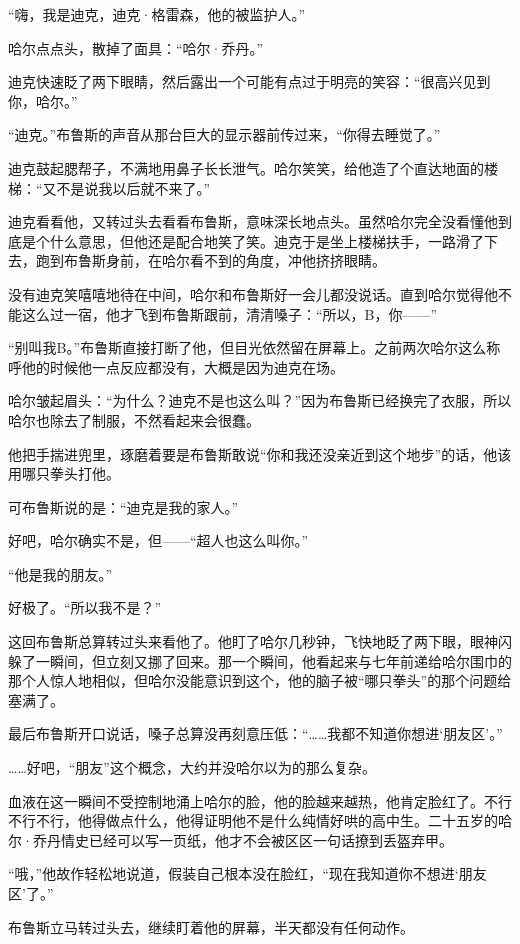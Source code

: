 \documentclass[../main]{subfiles}
\begin{document}
“嗨，我是迪克，迪克·格雷森，他的被监护人。”

哈尔点点头，散掉了面具：“哈尔·乔丹。”

迪克快速眨了两下眼睛，然后露出一个可能有点过于明亮的笑容：“很高兴见到你，哈尔。”

“迪克。”布鲁斯的声音从那台巨大的显示器前传过来，“你得去睡觉了。”

迪克鼓起腮帮子，不满地用鼻子长长泄气。哈尔笑笑，给他造了个直达地面的楼梯：“又不是说我以后就不来了。”

迪克看看他，又转过头去看看布鲁斯，意味深长地点头。虽然哈尔完全没看懂他到底是个什么意思，但他还是配合地笑了笑。迪克于是坐上楼梯扶手，一路滑了下去，跑到布鲁斯身前，在哈尔看不到的角度，冲他挤挤眼睛。

没有迪克笑嘻嘻地待在中间，哈尔和布鲁斯好一会儿都没说话。直到哈尔觉得他不能这么过一宿，他才飞到布鲁斯跟前，清清嗓子：“所以，B，你——”

“别叫我B。”布鲁斯直接打断了他，但目光依然留在屏幕上。之前两次哈尔这么称呼他的时候他一点反应都没有，大概是因为迪克在场。

哈尔皱起眉头：“为什么？迪克不是也这么叫？”因为布鲁斯已经换完了衣服，所以哈尔也除去了制服，不然看起来会很蠢。

他把手揣进兜里，琢磨着要是布鲁斯敢说“你和我还没亲近到这个地步”的话，他该用哪只拳头打他。

可布鲁斯说的是：“迪克是我的家人。”

好吧，哈尔确实不是，但——“超人也这么叫你。”

“他是我的朋友。”

好极了。“所以我不是？”

这回布鲁斯总算转过头来看他了。他盯了哈尔几秒钟，飞快地眨了两下眼，眼神闪躲了一瞬间，但立刻又挪了回来。那一个瞬间，他看起来与七年前递给哈尔围巾的那个人惊人地相似，但哈尔没能意识到这个，他的脑子被“哪只拳头”的那个问题给塞满了。

最后布鲁斯开口说话，嗓子总算没再刻意压低：“……我都不知道你想进`朋友区'。”

……好吧，“朋友”这个概念，大约并没哈尔以为的那么复杂。

血液在这一瞬间不受控制地涌上哈尔的脸，他的脸越来越热，他肯定脸红了。不行不行不行，他得做点什么，他得证明他不是什么纯情好哄的高中生。二十五岁的哈尔·乔丹情史已经可以写一页纸，他才不会被区区一句话撩到丢盔弃甲。

“哦，”他故作轻松地说道，假装自己根本没在脸红，“现在我知道你不想进`朋友区'了。”

布鲁斯立马转过头去，继续盯着他的屏幕，半天都没有任何动作。
\end{document}
